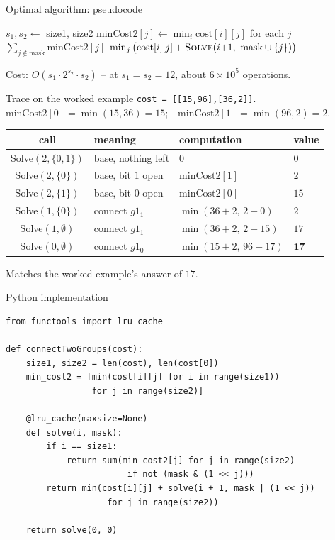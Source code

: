 \documentclass[11pt,aspectratio=169]{beamer}
\begin{document}
\begin{frame}{Optimal algorithm: pseudocode}
  \footnotesize
  \begin{algorithmic}[1]
      \State $s_1, s_2 \gets$ size1, size2
      \State $\text{minCost2}[j] \gets \min_i \text{cost}[i][j]$ for each $j$
       
          \State \Return $\sum_{j \notin \text{mask}} \text{minCost2}[j]$
        \EndIf
        \State \Return $\min_j \big(\text{cost}[i][j] + \Call{Solve}{i{+}1,\ \text{mask}
        \cup \{j\}}\big)$
      \EndFunction
      \State \Return {}
    \EndFunction
  \end{algorithmic}
  Cost: $O(s_1 \cdot 2^{s_2} \cdot s_2)$ -- at $s_1{=}s_2{=}12$, about $6\times10^5$
  operations.
\end{frame}

\begin{frame}{Trace on the worked example}
  \small
  \texttt{cost = [[15,96],[36,2]]}. $\text{minCost2}[0]=\min(15,36)=15$;\ \
  $\text{minCost2}[1]=\min(96,2)=2$.
  \begin{center}
  \begin{tabular}{@{}clll@{}}
    \toprule
    call & meaning & computation & value \\
    \midrule
    Solve$(2,\{0,1\})$ & base, nothing left & $0$ & $0$ \\
    Solve$(2,\{0\})$ & base, bit $1$ open & $\text{minCost2}[1]$ & $2$ \\
    Solve$(2,\{1\})$ & base, bit $0$ open & $\text{minCost2}[0]$ & $15$ \\
    Solve$(1,\{0\})$ & connect $g1_1$ & $\min(36{+}2,\,2{+}0)$ & $2$ \\
    Solve$(1,\emptyset)$ & connect $g1_1$ & $\min(36{+}2,\,2{+}15)$ & $17$ \\
    Solve$(0,\emptyset)$ & connect $g1_0$ & $\min(15{+}2,\,96{+}17)$ & $\mathbf{17}$ \\
    \bottomrule
  \end{tabular}
  \end{center}
  Matches the worked example's answer of $17$.
\end{frame}

\begin{frame}[fragile]{Python implementation}
  \begin{lstlisting}[style=py]
from functools import lru_cache

def connectTwoGroups(cost):
    size1, size2 = len(cost), len(cost[0])
    min_cost2 = [min(cost[i][j] for i in range(size1))
                 for j in range(size2)]

    @lru_cache(maxsize=None)
    def solve(i, mask):
        if i == size1:
            return sum(min_cost2[j] for j in range(size2)
                        if not (mask & (1 << j)))
        return min(cost[i][j] + solve(i + 1, mask | (1 << j))
                    for j in range(size2))

    return solve(0, 0)
  \end{lstlisting}
\end{frame}
\end{document}
